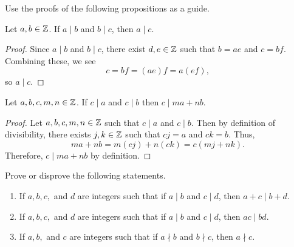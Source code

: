 \documentclass[handout]{ximera}
\date{\classday, 2024}
\begin{document}
\handoutAbstract
\maketitle

Use the proofs of the following propositions as a guide.

\begin{proposition}%
    Let $a,b\in\mathbb Z$. If $a\mid b$ and $b \mid c$, then $a\mid c$.
    \begin{proof}
        Since $a\mid b$ and $b \mid c$, there exist $d,e\in\mathbb Z$ such that $b=ae$ and $c=bf$. Combining these, we see \[c=bf=(ae)f=a(ef),\] so $a\mid c$.
    \end{proof}
\end{proposition}



\begin{proposition}%
    Let $a,b,c,m,n\in\mathbb Z$.
    If $c\mid a$ and $c\mid b$ then $c\mid ma+nb$.

    \begin{proof}
        Let $a,b,c,m,n\in\mathbb Z$ such that $c\mid a$ and $c\mid b$. Then by definition of divisibility, there exists $j,k\in\mathbb Z$ such that $cj=a$ and $ck=b$. Thus, \[ma+nb=m(cj)+n(ck)=c(mj+nk).\] Therefore, $c\mid ma+nb$ by definition.
    \end{proof}
\end{proposition}

\begin{br}%
    Prove or disprove the following statements.
    \begin{enumerate}
        \item If $a,b,c,$ and $d$ are integers such that if $a\mid b$ and $c\mid d$, then $a+c\mid b+d$.
        \item If $a,b,c,$ and $d$ are integers such that if $a\mid b$ and $c\mid d$, then $ac\mid bd$.
        \item If $a,b,$ and $c$ are integers such that if $a\nmid b$ and $b\nmid c$, then $a\nmid c$.
    \end{enumerate}
\end{br}

\pdfOnly{\ifhandout{
    \vfill
    \vfill}
\else
\fi}
\end{document}
